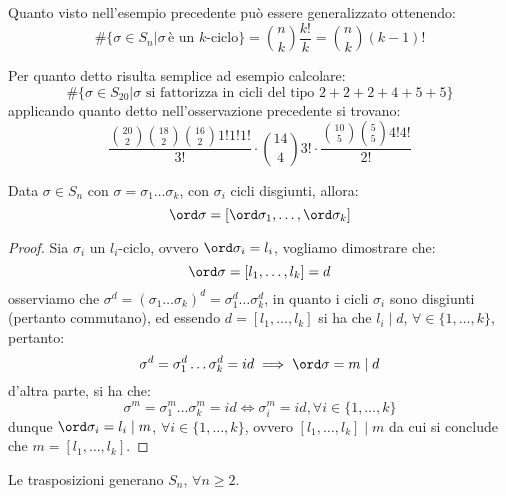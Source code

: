 \documentclass[11pt]{scrartcl}
\begin{document}
\begin{remark}
    Quanto visto nell'esempio precedente può essere generalizzato ottenendo:
        \[ \#\{\sigma \in S_n | \sigma\,\text{è un $k$-ciclo}\} = \binom{n}{k}\frac{k!}{k} = \binom{n}{k}(k-1)!
            \]
\end{remark}

\begin{example}
    Per quanto detto risulta semplice ad esempio calcolare:
        \[ \#\{\sigma \in S_{20} | \text{$\sigma$ si fattorizza in cicli del tipo $2+2+2+4+5+5$}\}
            \]
    applicando quanto detto nell'osservazione precedente si trovano:
        \[ \frac{\binom{20}{2}\binom{18}{2}\binom{16}{2}1!1!1!}{3!} \cdot \binom{14}{4}3! \cdot \frac{\binom{10}{5}\binom{5}{5}4!4!}{2!}
            \]
\end{example}

\begin{proposition}
    Data $\sigma \in S_n$ con $\sigma = \sigma_1\ldots\sigma_k$, con $\sigma_i$ cicli disgiunti, allora:
        \[ \ord \sigma = [\ord \sigma_1,\ldots, \ord\sigma_k]
            \]
\end{proposition}

\begin{proof}
    Sia $\sigma_i$ un $l_i$-ciclo, ovvero $\ord\sigma_i = l_i$, vogliamo dimostrare che:
        \[ \ord\sigma = [l_1,\ldots,l_k] = d
            \]
    osserviamo che $\sigma^d = (\sigma_1\ldots\sigma_k)^d = \sigma_1^d\ldots\sigma_k^d$, in quanto i cicli $\sigma_i$ sono disgiunti (pertanto commutano),
    ed essendo $d = [l_1,\ldots,l_k]$ si ha che $l_i \mid d$, $\forall \in \{1,\ldots,k\}$, pertanto:
        \[ \sigma^d = \sigma_1^d\ldots\sigma_k^d = id \implies \ord \sigma = m \mid d
            \]
    d'altra parte, si ha che:
        \[ \sigma^m = \sigma_1^m\ldots\sigma_k^m = id \iff \sigma_i^m = id, \forall i \in\{1,\ldots,k\}
            \]
    dunque $\ord \sigma_i = l_i \mid m$, $\forall i \in\{1,\ldots,k\}$, ovvero $[l_1,\ldots,l_k] \mid m$ da cui si conclude che $m = [l_1,\ldots,l_k]$.
\end{proof}

\begin{proposition}
    \label{trasp}
    Le trasposizioni generano $S_n$, $\forall n \geq 2$.
\end{proposition}
\end{document}
